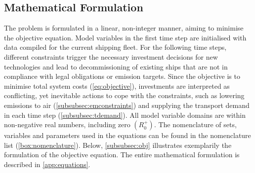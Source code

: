 \documentclass[article]{elsarticle}
\begin{document}
\subsection{Mathematical Formulation}
\label{subsec:Mat}
The problem is formulated in a linear, non-integer manner, aiming to minimise the objective equation. Model variables in the first time step are initialised with data compiled for the current shipping fleet. For the following time steps, different constraints trigger the necessary investment decisions for new technologies and lead to decommissioning of existing ships that are not in compliance with legal obligations or emission targets. Since the objective is to minimise total system costs  (\autoref{eq:objective}), investments are interpreted as conflicting, yet inevitable actions to cope with the constraints, such as lowering emissions to air (\ref{subsubsec:emconstraints}) and supplying the transport demand in each time step (\ref{subsubsec:tdemand}). All model variable domains are within non-negative real numbers, including zero $\left(R_{0}^{+}\right)$. The nomenclature of sets, variables and parameters used in the equations can be found in the nomenclature list (\ref{box:nomenclature}). Below, \autoref{subsubsec:obj} illustrates exemplarily the formulation of the objective equation. The entire mathematical formulation is described in \ref{app:equations}.
\end{document}
